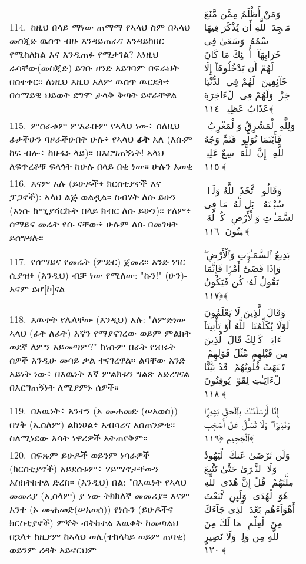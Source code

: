 \documentclass[11pt,a4paper,oneside]{article}%
\newcommand{\mytextarabic}[1]{\textarabic{ #1 \flushright}}
\begin{document}
\begin{longtable}{%
  @{}
    p{}
  @{~~~}
    p{}
    @{}
}
114.\ ከዚህ በላይ ማነው ጠማማ የኣላህ ስም በኣላህ መስጂድ ዉስጥ ብዙ እንዳይጠራና እንዳይከበር የሚከለክል እና እንዲጠፉ የሚታገል? እነዚህ ራሳቸው(መስጂድ) ይገቡ ዘንድ አይገባም በፍራህት በስተቀር። ለነዚህ እዚህ አለም ዉስጥ ዉርዴት፥ በሰማይዊ ህይወት ደግሞ ታላቅ ቅጣት ይኖራቸዋል  &  \mytextarabic{ وَمَنْ أَظْلَمُ مِمَّن مَّنَعَ مَسَٟجِدَ ٱللَّهِ أَن يُذْكَرَ فِيهَا ٱسْمُهُۥ وَسَعَىٰ فِى خَرَابِهَآ ۚ أُو۟لَٟٓئِكَ مَا كَانَ لَهُمْ أَن يَدْخُلُوهَآ إِلَّا خَآئِفِينَ ۚ لَهُمْ فِى ٱلدُّنْيَا خِزْىٌۭ وَلَهُمْ فِى ٱلْءَاخِرَةِ عَذَابٌ عَظِيمٌۭ ﴿١١٤﴾}\\
115.\ ምስራቁም ምእራቡም የኣላህ ነው፥ ስለዚህ ፊታችሁን ባዞራችሁበት ሁሉ፥ የኣላህ  {\bf ፊት} አለ (እሱም ከፍ ብሎ፥ ከዙፋኑ ላይ)። በእርግጠኝነት! ኣላህ ለፍጥረቶቹ ፍላጎት ከሁሉ በላይ በቂ ነው። ሁሉን አወቂ &  \mytextarabic{وَلِلَّهِ ٱلْمَشْرِقُ وَٱلْمَغْرِبُ ۚ فَأَيْنَمَا تُوَلُّوا۟ فَثَمَّ وَجْهُ ٱللَّهِ ۚ إِنَّ ٱللَّهَ وَٟسِعٌ عَلِيمٌۭ ﴿١١٥﴾}\\
116.\ እናም አሉ (ይሁዶች፥ ክርስቲያኖች እና ፓጋኖች): ኣላህ ልጅ ወልዷል። ስብሃት ለሱ ይሁን (እነሱ ከሚያሻርኩት በላይ ክብር ለሱ ይሁን)። የለም፥ ሰማይና መሬት የሱ ናቸው፥ ሁሉም ለሱ በመገዛት ይሰግዳሉ።  &  \mytextarabic{وَقَالُوا۟ ٱتَّخَذَ ٱللَّهُ وَلَدًۭا ۗ سُبْحَٟنَهُۥ ۖ بَل لَّهُۥ مَا فِى ٱلسَّمَـٰوَٟتِ وَٱلْأَرْضِ ۖ كُلٌّۭ لَّهُۥ قَٟنِتُونَ ﴿١١٦﴾}\\
117.\ የሰማይና የመሬት (ምድር) ጀመሪ። አንድ ነገር ሲያዝ፥ (እንዲህ) ብቻ ነው የሚለው: "ኩን!" (ሁን)-እናም ይሆ[ኮ]ናል  &  \mytextarabic{ بَدِيعُ ٱلسَّمَـٰوَٟتِ وَٱلْأَرْضِ ۖ وَإِذَا قَضَىٰٓ أَمْرًۭا فَإِنَّمَا يَقُولُ لَهُۥ كُن فَيَكُونُ ﴿١١٧﴾}\\
118.\ እዉቀት የሌላቸው (እንዲህ) አሉ: "ለምድነው ኣላህ (ፊት ለፊት) እኛን የማያናገረው ወይም ምልክት ወደኛ ለምን አይመጣም?" ከነሱም በፊት የነበሩት ሰዎች እንዲሁ መሳይ ቃል ተናገረዋል። ልባቸው አንድ አይነት ነው፥ በእዉነት እኛ ምልክቱን ግልጽ አድረገናል በእርግጠኝነት ለሚያምኑ ሰዎች።  &  \mytextarabic{وَقَالَ ٱلَّذِينَ لَا يَعْلَمُونَ لَوْلَا يُكَلِّمُنَا ٱللَّهُ أَوْ تَأْتِينَآ ءَايَةٌۭ ۗ كَذَٟلِكَ قَالَ ٱلَّذِينَ مِن قَبْلِهِم مِّثْلَ قَوْلِهِمْ ۘ تَشَٟبَهَتْ قُلُوبُهُمْ ۗ قَدْ بَيَّنَّا ٱلْءَايَـٰتِ لِقَوْمٍۢ يُوقِنُونَ ﴿١١٨﴾}\\
119.\ በእዉነት፥ አንተን (ኦ ሙሐመድ (ሠአወሰ)) በሃቅ (ኢስለም) ልከነሀል፥ አብሳሪና አስጠንቃቂ። ስለሚነደው እሳት ነዋሪዎች አትጠየቅም። &  \mytextarabic{ إِنَّآ أَرْسَلْنَـٰكَ بِٱلْحَقِّ بَشِيرًۭا وَنَذِيرًۭا ۖ وَلَا تُسْـَٔلُ عَنْ أَصْحَٟبِ ٱلْجَحِيمِ ﴿١١٩﴾}\\
120.\ በፍጹም ይሁዶች ወይንም ነሳራዎች (ክርስቲያኖች) አይደሰቱም፥ ሃይማኖታቸውን እስክትከተል ድረስ። (እንዲህ) በል: "በእዉነት የኣላህ መመሪያ (ኢስላም) ያ ነው ትክክለኛ መመሪያ። እናም አንተ (ኦ ሙሐመድ(ሠአወሰ)) የነሱን (ይሁዶችና ክርስቲያኖች) ምኞት ብትከተል እዉቀት ከመጣልህ በኋላ፥ ከዚያም ከኣላህ ወሊ(ተከላካይ ወይም ጠባቂ) ወይንም ረዳት አይኖርህም  &  \mytextarabic{ وَلَن تَرْضَىٰ عَنكَ ٱلْيَهُودُ وَلَا ٱلنَّصَٟرَىٰ حَتَّىٰ تَتَّبِعَ مِلَّتَهُمْ ۗ قُلْ إِنَّ هُدَى ٱللَّهِ هُوَ ٱلْهُدَىٰ ۗ وَلَىِٕنِ ٱتَّبَعْتَ أَهْوَآءَهُم بَعْدَ ٱلَّذِى جَآءَكَ مِنَ ٱلْعِلْمِ ۙ مَا لَكَ مِنَ ٱللَّهِ مِن وَلِىٍّۢ وَلَا نَصِيرٍ ﴿١٢٠﴾}\\

\end{longtable}
\end{document}
